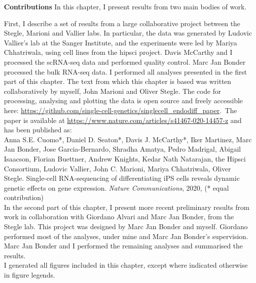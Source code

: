 \begin{Comment2}
\hspace{-3mm}\textbf{Contributions} 
In this chapter, I present results from two main bodies of work.

First, I describe a set of results from a large collaborative project between the Stegle, Marioni and Vallier labs. 
In particular, the data was generated by Ludovic Vallier’s lab at the Sanger Institute, and the experiments were led by Mariya Chhatriwala, using cell lines from the \gls{hipsci} project.
Davis McCarthy and I processed the scRNA-seq data and performed quality control.
Marc Jan Bonder processed the bulk RNA-seq data.
I performed all analyses presented in the first part of this chapter.
The text from which this chapter is based was written collaboratively by myself, John Marioni and Oliver Stegle.
The code for processing, analysing and plotting the data is open source and freely accessible here: \url{https://github.com/single-cell-genetics/singlecell\_endodiff\_paper}.\
The paper \cite{cuomo2020single} is available at \url{https://www.nature.com/articles/s41467-020-14457-z} and has been published as:\\

Anna S.E. Cuomo*, Daniel D. Seaton*, Davis J. McCarthy*, Iker Martinez, Marc Jan Bonder, Jose Garcia-Bernardo, Shradha Amatya, Pedro Madrigal, Abigail Isaacson, Florian Buettner, Andrew Knights, Kedar Nath Natarajan, the Hipsci Consortium, Ludovic Vallier, John C. Marioni, Mariya Chhatriwala, Oliver Stegle. Single-cell RNA-sequencing of differentiating iPS cells reveals dynamic genetic effects on gene expression. \textit{Nature Communications}, 2020, (* equal contribution)\\


In the second part of this chapter, I present more recent preliminary results from work in collaboration with Giordano Alvari and Marc Jan Bonder, from the Stegle lab.
This project was designed by Marc Jan Bonder and myself.
Giordano performed most of the analyses, under mine and Marc Jan Bonder's supervision.
Marc Jan Bonder and I performed the remaining analyses and summarised the results.\\

I generated all figures included in this chapter, except where indicated otherwise in figure legends.
\end{Comment2}

